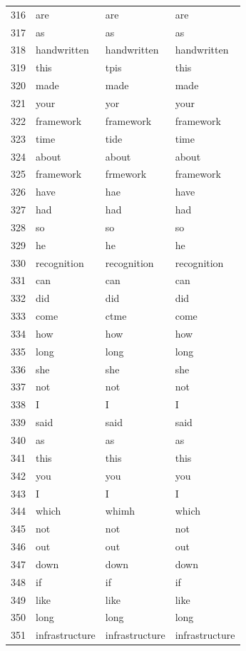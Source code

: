 \begin{longtable}{clll}
    316 & are & are & are \\
    317 & as & as & as \\
    318 & handwritten & handwritten & handwritten \\
    319 & this & tpis & this \\
    320 & made & made & made \\
    321 & your & yor & your \\
    322 & framework & framework & framework \\
    323 & time & tide & time \\
    324 & about & about & about \\
    325 & framework & frmework & framework \\
    326 & have & hae & have \\
    327 & had & had & had \\
    328 & so & so & so \\
    329 & he & he & he \\
    330 & recognition & recognition & recognition \\
    331 & can & can & can \\
    332 & did & did & did \\
    333 & come & ctme & come \\
    334 & how & how & how \\
    335 & long & long & long \\
    336 & she & she & she \\
    337 & not & not & not \\
    338 & I & I & I \\
    339 & said & said & said \\
    340 & as & as & as \\
    341 & this & this & this \\
    342 & you & you & you \\
    343 & I & I & I \\
    344 & which & whimh & which \\
    345 & not & not & not \\
    346 & out & out & out \\
    347 & down & down & down \\
    348 & if & if & if \\
    349 & like & like & like \\
    350 & long & long & long \\
    351 & infrastructure & infrastructure & infrastructure \\

\end{longtable}
